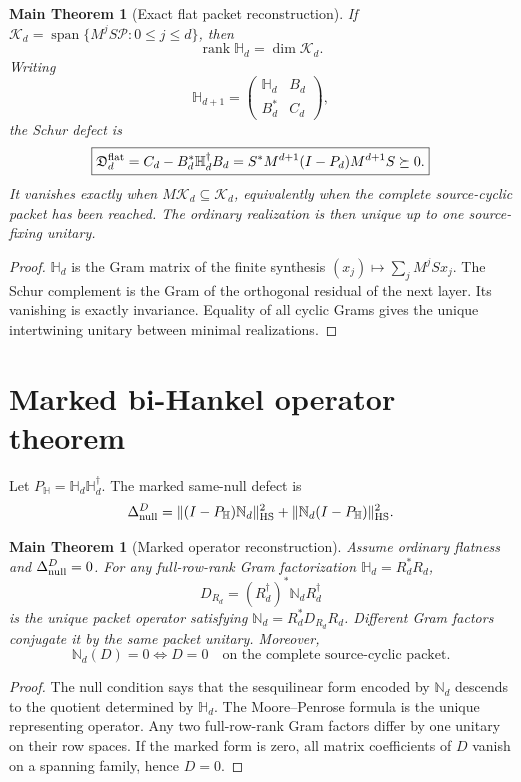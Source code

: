 \documentclass[11pt,oneside,openany]{book}
\numberwithin{equation}{chapter}
\newtheorem{maintheorem}[theorem]{Main Theorem}
\theoremstyle{definition}
\theoremstyle{remark}
\newcommand{\rank}{\operatorname{rank}}
\newcommand{\HS}{\mathrm{HS}}
\newcommand{\norm}[1]{\lVert #1\rVert}
\newcommand{\Span}{\operatorname{span}}
\begin{document}
\begin{maintheorem}[Exact flat packet reconstruction]
\label{thm:v6-flat-packet}
If \(\mathcal K_d=\Span\{M^jS\mathcal P:0\le j\le d\}\), then
\[
 \rank\mathbb H_d=\dim\mathcal K_d.
\]
Writing
\[
 \mathbb H_{d+1}=
 \begin{pmatrix}\mathbb H_d&B_d\\B_d^*&C_d\end{pmatrix},
\]
the Schur defect is
\[
 \boxed{\mathfrak D_d^{\rm flat}
 =C_d-B_d^*\mathbb H_d^\dagger B_d
 =S^*M^{d+1}(I-P_d)M^{d+1}S\succeq0.}
\]
It vanishes exactly when \(M\mathcal K_d\subseteq\mathcal K_d\), equivalently
when the complete source-cyclic packet has been reached.  The ordinary
realization is then unique up to one source-fixing unitary.
\end{maintheorem}

\begin{proof}
\(\mathbb H_d\) is the Gram matrix of the finite synthesis
\((x_j)\mapsto\sum_jM^jSx_j\).  The Schur complement is the Gram of the
orthogonal residual of the next layer.  Its vanishing is exactly invariance.
Equality of all cyclic Grams gives the unique intertwining unitary between
minimal realizations.
\end{proof}

\section{Marked bi-Hankel operator theorem}
Let \(P_{\mathbb H}=\mathbb H_d\mathbb H_d^\dagger\).  The marked same-null defect
is
\[
 \Delta_{\rm null}^D
 =\norm{(I-P_{\mathbb H})\mathbb N_d}_{\HS}^2
 +\norm{\mathbb N_d(I-P_{\mathbb H})}_{\HS}^2.
\]

\begin{maintheorem}[Marked operator reconstruction]
\label{thm:v6-marked-operator}
Assume ordinary flatness and \(\Delta_{\rm null}^D=0\).  For any full-row-rank
Gram factorization \(\mathbb H_d=R_d^*R_d\),
\[
 \boxed{D_{R_d}=(R_d^\dagger)^*\mathbb N_dR_d^\dagger}
\]
is the unique packet operator satisfying
\(\mathbb N_d=R_d^*D_{R_d}R_d\).  Different Gram factors conjugate it by the
same packet unitary.  Moreover,
\[
 \boxed{\mathbb N_d(D)=0\iff D=0
 \quad\text{on the complete source-cyclic packet}.}
\]
\end{maintheorem}

\begin{proof}
The null condition says that the sesquilinear form encoded by \(\mathbb N_d\)
descends to the quotient determined by \(\mathbb H_d\).  The Moore--Penrose
formula is the unique representing operator.  Any two full-row-rank Gram
factors differ by one unitary on their row spaces.  If the marked form is zero,
all matrix coefficients of \(D\) vanish on a spanning family, hence \(D=0\).
\end{proof}
\end{document}

